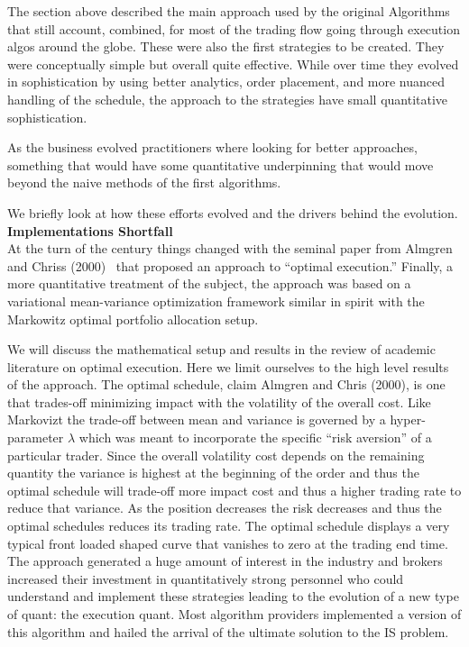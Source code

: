 The section above described the main approach used by the original Algorithms that still account, combined, for most of the trading flow going through execution algos around the globe. These were also the  first strategies to be created. They were conceptually simple but overall quite effective. While over time they evolved in sophistication by using better analytics, order placement, and more nuanced handling of the schedule, the approach to the strategies have small quantitative sophistication.


As the business evolved practitioners where looking for better approaches, something that would have some quantitative underpinning that would move beyond the naive methods of the first algorithms.


We briefly look at how these efforts evolved and the drivers behind the evolution. \\


\noindent\textbf{Implementations Shortfall} \\


At the turn of the century things changed with the seminal paper from Almgren and Chriss (2000)~\cite{alm2000} that proposed an approach to ``optimal execution.'' Finally, a more quantitative treatment of the subject, the approach was based on a variational  mean-variance optimization framework similar in spirit with the Markowitz optimal portfolio allocation setup.


We will discuss the  mathematical setup and results in the review of  academic literature on optimal execution. Here we limit ourselves to the high level results of the approach. The optimal schedule, claim Almgren and Chris (2000), is one that trades-off minimizing impact with the volatility of the overall cost. Like Markovizt the trade-off between mean and variance is governed by a hyper-parameter $\lambda$ which was meant to incorporate the specific ``risk aversion'' of a particular trader. Since the overall volatility cost depends on the remaining quantity the variance is highest at the beginning of the order and thus the optimal schedule will trade-off more impact cost and thus a higher trading rate to reduce that variance. As the position decreases the risk decreases and thus the optimal schedules reduces its trading rate. The optimal schedule displays a very typical front loaded shaped curve that vanishes to zero at the trading end time.\\

The approach generated a huge amount of interest in the industry and  brokers increased their investment in quantitatively strong personnel who could understand and implement these strategies leading to the evolution of a new type of quant: the execution quant. Most algorithm providers implemented a version of this algorithm and hailed the arrival of the ultimate solution to the IS problem. 

